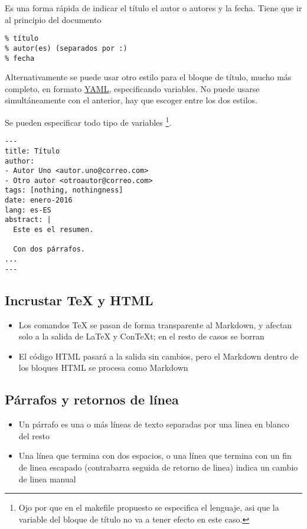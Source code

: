 \documentclass[12pt,spanish,]{article}
\providecommand{\tightlist}{%
  \setlength{\itemsep}{0pt}\setlength{\parskip}{0pt}}
\begin{document}
Es una forma rápida de indicar el título el autor o autores y la fecha.
Tiene que ir al principio del documento

\begin{verbatim}
% título
% autor(es) (separados por :)
% fecha
\end{verbatim}

Alternativamente se puede usar otro estilo para el bloque de título,
mucho más completo, en formato
\href{https://en.wikipedia.org/wiki/YAML}{YAML}, especificando
variables. No puede usarse simultáneamente con el anterior, hay que
escoger entre los dos estilos.

Se pueden especificar todo tipo de variables \footnote{Ojo por que en el
  makefile propuesto se especifica el lenguaje, asi que la variable del
  bloque de título no va a tener efecto en este caso.}.

\begin{verbatim}
---
title: Título
author:
- Autor Uno <autor.uno@correo.com>
- Otro autor <otroautor@correo.com>
tags: [nothing, nothingness]
date: enero-2016
lang: es-ES
abstract: |
  Este es el resumen.

  Con dos párrafos.
...
---
\end{verbatim}

\subsection{Incrustar TeX y HTML}\label{incrustar-tex-y-html}

\begin{itemize}
\tightlist
\item
  Los comandos TeX se pasan de forma transparente al Markdown, y afectan
  solo a la salida de LaTeX y ConTeXt; en el resto de casos se borran
\item
  El código HTML pasará a la salida sin cambios, pero el Markdown dentro
  de los bloques HTML se procesa como Markdown
\end{itemize}

\subsection{Párrafos y retornos de
línea}\label{puxe1rrafos-y-retornos-de-luxednea}

\begin{itemize}
\tightlist
\item
  Un párrafo es una o más líneas de texto separadas por una linea en
  blanco del resto
\item
  Una línea que termina con dos espacios, o una línea que termina con un
  fin de linea escapado (contrabarra seguida de retorno de linea) indica
  un cambio de linea manual
\end{itemize}
\end{document}
